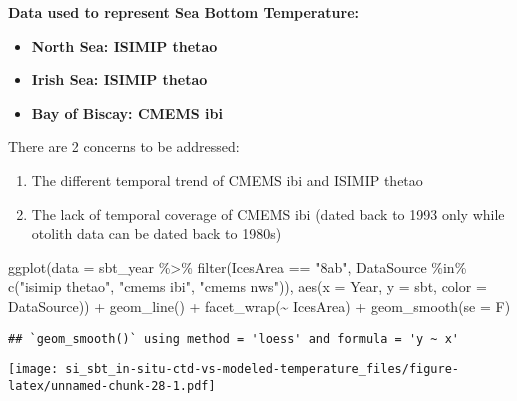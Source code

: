 \documentclass[
]{article}
\newenvironment{Shaded}{\begin{snugshade}}{\end{snugshade}}
\newcommand{\AttributeTok}[1]{\textcolor[rgb]{0.77,0.63,0.00}{#1}}
\newcommand{\FunctionTok}[1]{\textcolor[rgb]{0.00,0.00,0.00}{#1}}
\newcommand{\NormalTok}[1]{#1}
\newcommand{\SpecialCharTok}[1]{\textcolor[rgb]{0.00,0.00,0.00}{#1}}
\newcommand{\StringTok}[1]{\textcolor[rgb]{0.31,0.60,0.02}{#1}}
\providecommand{\tightlist}{%
  \setlength{\itemsep}{0pt}\setlength{\parskip}{0pt}}
\begin{document}
\textbf{Data used to represent Sea Bottom Temperature:}

\begin{itemize}
\item
  \textbf{North Sea: ISIMIP thetao}
\item
  \textbf{Irish Sea: ISIMIP thetao}
\item
  \textbf{Bay of Biscay: CMEMS ibi}
\end{itemize}

There are 2 concerns to be addressed:

\begin{enumerate}
\def\labelenumi{\arabic{enumi}.}
\tightlist
\item
  The different temporal trend of CMEMS ibi and ISIMIP thetao
\item
  The lack of temporal coverage of CMEMS ibi (dated back to 1993 only
  while otolith data can be dated back to 1980s)
\end{enumerate}

\begin{Shaded}
\begin{Highlighting}[]
\FunctionTok{ggplot}\NormalTok{(}\AttributeTok{data =}\NormalTok{ sbt\_year }\SpecialCharTok{\%\textgreater{}\%} \FunctionTok{filter}\NormalTok{(IcesArea }\SpecialCharTok{==} \StringTok{"8ab"}\NormalTok{, DataSource }\SpecialCharTok{\%in\%} \FunctionTok{c}\NormalTok{(}\StringTok{"isimip thetao"}\NormalTok{, }\StringTok{"cmems ibi"}\NormalTok{, }\StringTok{"cmems nws"}\NormalTok{)), }\FunctionTok{aes}\NormalTok{(}\AttributeTok{x =}\NormalTok{ Year, }\AttributeTok{y =}\NormalTok{ sbt, }\AttributeTok{color =}\NormalTok{ DataSource)) }\SpecialCharTok{+} \FunctionTok{geom\_line}\NormalTok{() }\SpecialCharTok{+} \FunctionTok{facet\_wrap}\NormalTok{(}\SpecialCharTok{\textasciitilde{}}\NormalTok{ IcesArea) }\SpecialCharTok{+} \FunctionTok{geom\_smooth}\NormalTok{(}\AttributeTok{se =}\NormalTok{ F)}
\end{Highlighting}
\end{Shaded}

\begin{verbatim}
## `geom_smooth()` using method = 'loess' and formula = 'y ~ x'
\end{verbatim}

\texttt{[image: si\_sbt\_in-situ-ctd-vs-modeled-temperature\_files/figure-latex/unnamed-chunk-28-1.pdf]}
\end{document}
